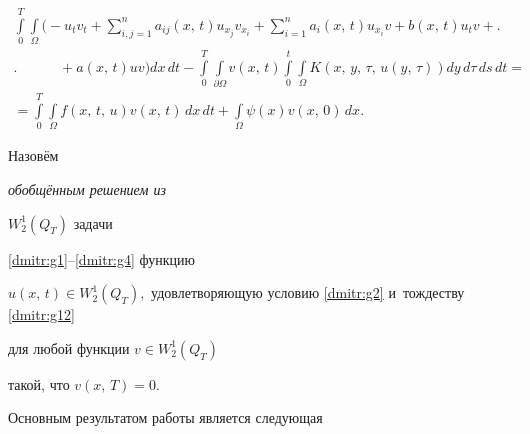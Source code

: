 \begin{multline}


 \int\limits_{0}^{T}\int\limits_{\Omega}\Biggl(-u_{t}v_{t}+


\sum\limits_{i,j=1}^n a_{ij}(x,\,t)u_{x_j}v_{x_i}


+\sum\limits_{i=1}^{n}a_i(x,\,t)u_{x_i}v +b(x,\,t)u_tv+\Biggr.


\\ \Biggl. \phantom{\sum\limits_{i=1}^{n}}


+a(x,\,t)uv\Biggr)dx\,dt-


\int\limits_{0}^{T}\int\limits_{\partial\Omega}v(x,\,t)


\int\limits_0^t\int\limits_{\Omega}K(x,\,y,\,\tau,\,u(y,\,\tau))dy\,d\tau\,ds\,dt=\\


\label{dmitr:g12}


=\int\limits_{0}^{T}\int\limits_{\Omega}f(x,\,t,\,u)v(x,\,t)\,dx\,dt+


\int\limits_{\Omega}\psi(x)v(x,\,0)\,dx.


\end{multline}





\begin{definition}


 Назовём {\it обобщённым решением из


	$W_{2}^{1}(Q_{T})$ задачи } \eqref{dmitr:g1}--\eqref{dmitr:g4} функцию


$u(x,\,t)\in W_{2}^{1}(Q_{T}),$ удовлетворяющую условию \eqref{dmitr:g2} и~тождеству \eqref{dmitr:g12}


для любой функции $v\in W_{2}^{1}(Q_{T})$


такой{\rm,} что $v(x,\,T)=0$.


\end{definition}








Основным результатом работы является следующая


